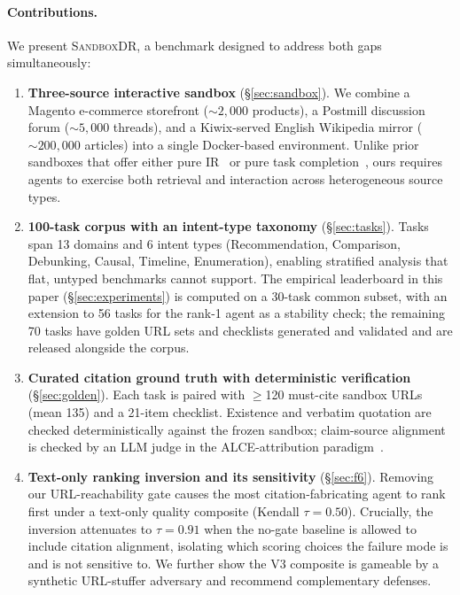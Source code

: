 \documentclass{article}
\newcommand{\ours}{\textsc{SandboxDR}}
\begin{document}
\paragraph{Contributions.} We present \ours{}, a benchmark designed to address both gaps simultaneously:
\begin{enumerate}[leftmargin=*,itemsep=3pt]
\item \textbf{Three-source interactive sandbox} (\S\ref{sec:sandbox}). We combine a Magento e-commerce storefront (${\sim}2{,}000$ products), a Postmill discussion forum (${\sim}5{,}000$ threads), and a Kiwix-served English Wikipedia mirror (${\sim}200{,}000$ articles) into a single Docker-based environment. Unlike prior sandboxes that offer either pure IR~\citep{deepresearchgym2025,browsecomp_plus2025} or pure task completion~\citep{webarena2024}, ours requires agents to exercise both retrieval and interaction across heterogeneous source types.

\item \textbf{100-task corpus with an intent-type taxonomy} (\S\ref{sec:tasks}). Tasks span 13 domains and 6 intent types (Recommendation, Comparison, Debunking, Causal, Timeline, Enumeration), enabling stratified analysis that flat, untyped benchmarks cannot support. The empirical leaderboard in this paper (\S\ref{sec:experiments}) is computed on a 30-task common subset, with an extension to 56 tasks for the rank-1 agent as a stability check; the remaining 70 tasks have golden URL sets and checklists generated and validated and are released alongside the corpus.

\item \textbf{Curated citation ground truth with deterministic verification} (\S\ref{sec:golden}). Each task is paired with $\geq$120 must-cite sandbox URLs (mean 135) and a 21-item checklist. Existence and verbatim quotation are checked deterministically against the frozen sandbox; claim-source alignment is checked by an LLM judge in the ALCE-attribution paradigm~\citep{alce2023}.

\item \textbf{Text-only ranking inversion and its sensitivity} (\S\ref{sec:f6}). Removing our URL-reachability gate causes the most citation-fabricating agent to rank first under a text-only quality composite (Kendall $\tau{=}0.50$). Crucially, the inversion attenuates to $\tau{=}0.91$ when the no-gate baseline is allowed to include citation alignment, isolating which scoring choices the failure mode is and is not sensitive to. We further show the V3 composite is gameable by a synthetic URL-stuffer adversary and recommend complementary defenses.
\end{enumerate}
\end{document}
